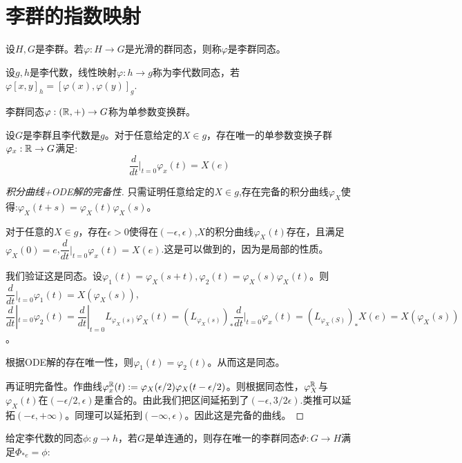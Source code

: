 \section{李群的指数映射}
\begin{definition}[李群同态]
    设$H,G$是李群。若$\varphi:H \to G$是光滑的群同态，则称$\varphi$是李群同态。
\end{definition}
\begin{definition}[李代数同态]
    设$g,h$是李代数，线性映射$\varphi:h \to g$称为李代数同态，若$\varphi[x,y]_h =[\varphi(x),\varphi(y)]_g$.
\end{definition}
\begin{definition}[单参数变换群]
    李群同态$\varphi:(\mathbb{R},+) \to G$称为单参数变换群。
\end{definition}
\begin{proposition}\label{pro:eee}
    设$G$是李群且李代数是$g$。对于任意给定的$X \in g$，存在唯一的单参数变换子群$\varphi_x:\mathbb{R} \to G$满足:
    $$
    \dfrac{d}{dt}|_{t=0}\varphi_x(t)=X(e)
    $$
\end{proposition}
\begin{proof}[积分曲线+ODE解的完备性]
    只需证明任意给定的$X \in g$,存在完备的积分曲线$\varphi_X$使得:$\varphi_X(t+s)=\varphi_X(t)\varphi_X(s)$。

    对于任意的$X \in g$，存在$\epsilon>0$使得在$(-\epsilon,\epsilon)$,$X$的积分曲线$\varphi_X(t)$存在，且满足$\varphi_X(0)=e$,$\dfrac{d}{dt}|_{t=0}\varphi_x(t)=X(e)$.这是可以做到的，因为是局部的性质。

    我们验证这是同态。设$\varphi_1(t)=\varphi_X(s+t),\varphi_2(t)=\varphi_X(s)\varphi_X(t)$。则$\dfrac{d}{dt}|_{t=0}\varphi_1(t)=X(\varphi_X(s))$,$\dfrac{d}{dt}|_{t=0}\varphi_2(t)=\dfrac{d}{dt}|_{t=0}L_{\varphi_X(s)}\varphi_X(t)=(L_{\varphi_X(s)})_*\dfrac{d}{dt}|_{t=0}\varphi_x(t)=(L_{\varphi_X(S)})_* X(e)=X(\varphi_X(s))$。

    根据ODE解的存在唯一性，则$\varphi_1(t)=\varphi_2(t)$。从而这是同态。

    再证明完备性。作曲线$\varphi_x^{\mathbb{R}}(t):=\varphi_X(\epsilon/2)\varphi_X(t-\epsilon/2)$。则根据同态性，$\varphi_X^{\mathbb{R}}$与$\varphi_X(t)$在$(-\epsilon/2,\epsilon)$是重合的。由此我们把区间延拓到了$(-\epsilon,3/2\epsilon)$.类推可以延拓$(-\epsilon,+\infty)$。同理可以延拓到$(-\infty,\epsilon)$。因此这是完备的曲线。
\end{proof}
\begin{theorem}
    给定李代数的同态$\phi:g \to h$，若$G$是单连通的，则存在唯一的李群同态$\Phi:G \to H$满足$\Phi_{*e}=\phi$:
\end{theorem}
